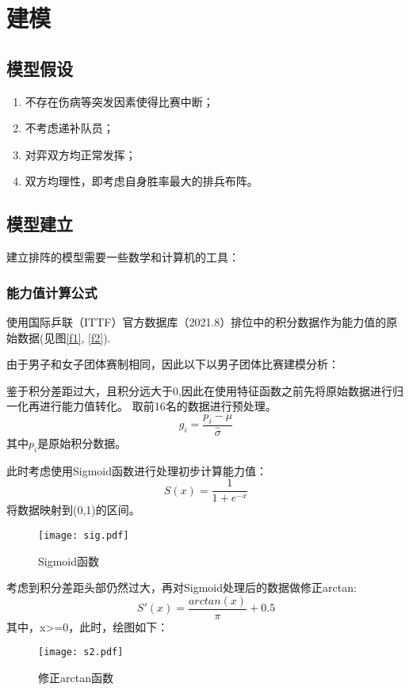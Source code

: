 \documentclass[a4paper,AutoFakeBold,AutoFakeSlant]{ctexart}
\begin{document}
\section{建模}

\subsection{模型假设}
\begin{enumerate}
  \item 不存在伤病等突发因素使得比赛中断；
  \item 不考虑递补队员；
  \item 对弈双方均正常发挥；
  \item 双方均理性，即考虑自身胜率最大的排兵布阵。
\end{enumerate}

\subsection{模型建立}
建立排阵的模型需要一些数学和计算机的工具：

\subsubsection{能力值计算公式}

使用国际乒联（ITTF）官方数据库（2021.8）排位中的积分数据\cite{Rankings}作为能力值的原始数据(见图\ref{f1}, \ref{f2}).

由于男子和女子团体赛制相同，因此以下以男子团体比赛建模分析：

鉴于积分差距过大，且积分远大于0,因此在使用特征函数之前先将原始数据进行归一化再进行能力值转化。
取前16名的数据进行预处理。
\begin{equation}
  g_i = \frac{p_i - \mu}{\hat{\sigma}}
\end{equation}
其中$p_i$是原始积分数据。


此时考虑使用Sigmoid函数进行处理初步计算能力值：
\begin{equation}
  S(x) = \frac{1}{1 + e^{-x}}
\end{equation}
将数据映射到(0,1)的区间。
\begin{figure}[htbp]
  \centering
  \texttt{[image: sig.pdf]}
  \caption{Sigmoid函数}
  \label{f3}
\end{figure}

考虑到积分差距头部仍然过大，再对Sigmoid处理后的数据做修正arctan:
\begin{equation}
  S'(x) = \frac{arctan(x)}{\pi} + 0.5
\end{equation}
其中，x>=0，此时，绘图如下：
\begin{figure}[htbp]
  \centering
  \texttt{[image: s2.pdf]}
  \caption{修正arctan函数}
  \label{f4}
\end{figure}
\end{document}
